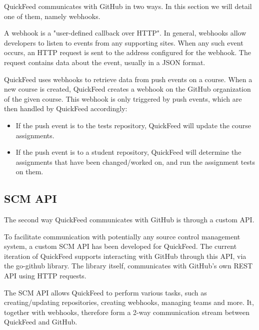 QuickFeed communicates with GitHub in two ways.
In this section we will detail one of them, namely webhooks.

A webhook is a "user-defined callback over HTTP". %
In general, webhooks allow developers to listen to events from any supporting sites.
When any such event occurs, an HTTP request is sent to the address configured for the webhook.
The request contains data about the event, usually in a JSON format.

QuickFeed uses webhooks to retrieve data from push events on a course.
When a new course is created, QuickFeed creates a webhook on the GitHub organization of the given course.
This webhook is only triggered by push events, which are then handled by QuickFeed accordingly:

\begin{itemize}
    \item If the push event is to the tests repository, QuickFeed will update the course assignments.
    \item If the push event is to a student repository, QuickFeed will determine the assignments that have been changed/worked on, 
    and run the assignment tests on them.
\end{itemize}

\subsection{SCM API}

The second way QuickFeed communicates with GitHub is through a custom API.

To facilitate communication with potentially any source control management system, a custom SCM API has been developed for QuickFeed.
The current iteration of QuickFeed supports interacting with GitHub through this API, via the go-github library. %
The library itself, communicates with GitHub's own REST API using HTTP requests.

The SCM API allows QuickFeed to perform various tasks, such as creating/updating repositories, creating webhooks, managing teams and more.
It, together with webhooks, therefore form a 2-way communication stream between QuickFeed and GitHub.